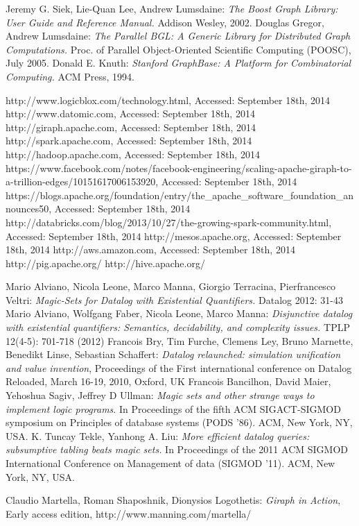 \begin{thebibliography}{99}
 Jeremy G. Siek, Lie-Quan Lee, Andrew Lumsdaine: \textit{The Boost Graph Library: User Guide and Reference Manual.} Addison Wesley, 2002.
 Douglas Gregor, Andrew Lumsdaine: \textit{The Parallel BGL: A Generic Library for Distributed Graph Computations.} Proc. of Parallel Object-Oriented Scientific Computing (POOSC), July 2005.
 Donald E. Knuth: \textit{Stanford GraphBase: A Platform for Combinatorial Computing.} ACM Press, 1994.

 http://www.logicblox.com/technology.html, Accessed: September 18th, 2014
 http://www.datomic.com, Accessed: September 18th, 2014
 http://giraph.apache.com, Accessed: September 18th, 2014
 http://spark.apache.com, Accessed: September 18th, 2014
 http://hadoop.apache.com, Accessed: September 18th, 2014
 https://www.facebook.com/notes/facebook-engineering/scaling-apache-giraph-to-a-trillion-edges/10151617006153920, Accessed: September 18th, 2014
 https://blogs.apache.org/foundation/entry/the\_apache\_software\_foundation\_announces50, Accessed: September 18th, 2014
 http://databricks.com/blog/2013/10/27/the-growing-spark-community.html, Accessed: September 18th, 2014
 http://mesos.apache.org, Accessed: September 18th, 2014
 http://aws.amazon.com, Accessed: September 18th, 2014
 http://pig.apache.org/
 http://hive.apache.org/

 Mario Alviano, Nicola Leone, Marco Manna, Giorgio Terracina, Pierfrancesco Veltri: \textit{Magic-Sets for Datalog with Existential Quantifiers.} Datalog 2012: 31-43
 Mario Alviano, Wolfgang Faber, Nicola Leone, Marco Manna: \textit{Disjunctive datalog with existential quantifiers: Semantics, decidability, and complexity issues.} TPLP 12(4-5): 701-718 (2012)
 Francois Bry, Tim Furche, Clemens Ley, Bruno Marnette, Benedikt Linse, Sebastian Schaffert: \textit{Datalog relaunched: simulation unification and value invention}, Proceedings of the First international conference on Datalog Reloaded, March 16-19, 2010, Oxford, UK
 Francois Bancilhon, David Maier, Yehoshua Sagiv, Jeffrey D Ullman: \textit{Magic sets and other strange ways to implement logic programs}. In Proceedings of the fifth ACM SIGACT-SIGMOD symposium on Principles of database systems (PODS '86). ACM, New York, NY, USA.
 K. Tuncay Tekle, Yanhong A. Liu: \textit{More efficient datalog queries: subsumptive tabling beats magic sets.} In Proceedings of the 2011 ACM SIGMOD International Conference on Management of data (SIGMOD '11). ACM, New York, NY, USA.

 Claudio Martella, Roman Shaposhnik, Dionysios Logothetis: \textit{Giraph in Action}, Early access edition, http://www.manning.com/martella/

\end{thebibliography}



